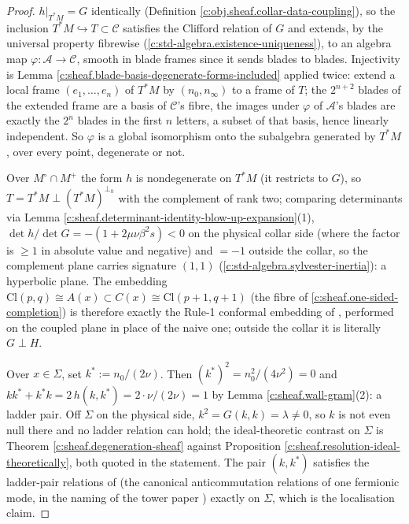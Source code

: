\documentclass[11pt]{article}
\theoremstyle{definition}
\theoremstyle{plain}
\providecommand{\Cl}{}\renewcommand{\Cl}{\mathrm{Cl}}
\providecommand{\Mo}{}\renewcommand{\Mo}{M^{\circ}}
\providecommand{\Mp}{}\renewcommand{\Mp}{M^{+}}
\providecommand{\Sig}{}\renewcommand{\Sig}{\Sigma}
\providecommand{\nInf}{}\renewcommand{\nInf}{n_\infty}
\providecommand{\nO}{}\renewcommand{\nO}{n_0}
\providecommand{\shA}{}\renewcommand{\shA}{\mathcal{A}}
\providecommand{\shC}{}\renewcommand{\shC}{\mathcal{C}}
\begin{document}
\begin{proof}
$h|_{T^*M} = G$ identically (Definition \ref{c:obj.sheaf.collar-data-coupling}), so the inclusion $T^*M \hookrightarrow T \subset \shC$ satisfies the Clifford relation of $G$ and extends, by the universal property fibrewise (\ref{c:std-algebra.existence-uniqueness}), to an algebra map $\varphi : \shA \to \shC$, smooth in blade frames since it sends blades to blades. Injectivity is Lemma \ref{c:sheaf.blade-basis-degenerate-forms-included} applied twice: extend a local frame $(e_1, \dots, e_n)$ of $T^*M$ by $(\nO, \nInf)$ to a frame of $T$; the $2^{n+2}$ blades of the extended frame are a basis of $\shC$'s fibre, the images under $\varphi$ of $\shA$'s blades are exactly the $2^n$ blades in the first $n$ letters, a subset of that basis, hence linearly independent. So $\varphi$ is a global isomorphism onto the subalgebra generated by $T^*M$, over every point, degenerate or not.

Over $\Mo \cap \Mp$ the form $h$ is nondegenerate on $T^*M$ (it restricts to $G$), so $T = T^*M \perp (T^*M)^{\perp_h}$ with the complement of rank two; comparing determinants via Lemma \ref{c:sheaf.determinant-identity-blow-up-expansion}(1), $\det h / \det G = -(1 + 2\mu\nu\beta^2 s) < 0$ on the physical collar side (where the factor is $\geq 1$ in absolute value and negative) and $= -1$ outside the collar, so the complement plane carries signature $(1,1)$ (\ref{c:std-algebra.sylvester-inertia}): a hyperbolic plane. The embedding $\Cl(p,q) \cong A(x) \subset C(x) \cong \Cl(p{+}1, q{+}1)$ (the fibre of \ref{c:sheaf.one-sided-completion}) is therefore exactly the Rule-1 conformal embedding of \cite[\S4.3]{ButlerT1}, performed on the coupled plane in place of the naive one; outside the collar it is literally $G \perp H$.

Over $x \in \Sig$, set $k^* := \nO/(2\nu)$. Then $(k^*)^2 = \nO^2/(4\nu^2) = 0$ and $k k^* + k^* k = 2\,h(k, k^*) = 2 \cdot \nu/(2\nu) = 1$ by Lemma \ref{c:sheaf.wall-gram}(2): a ladder pair. Off $\Sig$ on the physical side, $k^2 = G(k,k) = \lambda \neq 0$, so $k$ is not even null there and no ladder relation can hold; the ideal-theoretic contrast on $\Sig$ is Theorem \ref{c:sheaf.degeneration-sheaf} against Proposition \ref{c:sheaf.resolution-ideal-theoretically}, both quoted in the statement. The pair $(k, k^*)$ satisfies the ladder-pair relations of \cite[\S7]{ButlerT1} (the canonical anticommutation relations of one fermionic mode, in the naming of the tower paper \cite{ButlerT3}) exactly on $\Sig$, which is the localisation claim.

\end{proof}
\end{document}
